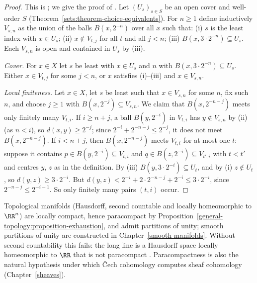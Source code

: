 \begin{proof}
This is \cite{stone-1948}; we give the proof of \cite{rudin-paracompact}. Let $(U_s)_{s \in S}$ be an open cover and well-order $S$
(Theorem~\ref{sets:theorem-choice-equivalents}). For $n \geq 1$ define inductively $V_{s,n}$ as the union of the balls $B(x, 2^{-n})$ over all $x$ such
that: (i) $s$ is the least index with $x \in U_s$; (ii) $x \notin V_{t,j}$ for all $t$ and all $j < n$; (iii) $B(x, 3 \cdot 2^{-n}) \subseteq U_s$. Each
$V_{s,n}$ is open and contained in $U_s$ by (iii).

\emph{Cover.} For $x \in X$ let $s$ be least with $x \in U_s$ and $n$ with $B(x, 3 \cdot 2^{-n}) \subseteq U_s$. Either $x \in V_{t,j}$ for some $j < n$, or $x$
satisfies (i)--(iii) and $x \in V_{s,n}$.

\emph{Local finiteness.} Let $x \in X$, let $s$ be least such that $x \in V_{s,n}$ for some $n$, fix such $n$, and choose $j \geq 1$ with $B(x, 2^{-j}) \subseteq V_{s,n}$.
We claim that $B(x, 2^{-n-j})$ meets only finitely many $V_{t,i}$. If $i \geq n + j$, a ball $B(y, 2^{-i})$ in $V_{t,i}$ has $y \notin V_{s,n}$ by (ii) (as
$n < i$), so $d(x, y) \geq 2^{-j}$; since $2^{-i} + 2^{-n-j} \leq 2^{-j}$, it does not meet $B(x, 2^{-n-j})$. If $i < n + j$, then $B(x, 2^{-n-j})$ meets
$V_{t,i}$ for at most one $t$: suppose it contains $p \in B(y, 2^{-i}) \subseteq V_{t,i}$ and $q \in B(z, 2^{-i}) \subseteq V_{t',i}$ with $t < t'$ and centres $y$, $z$
as in the definition. By (iii) $B(y, 3 \cdot 2^{-i}) \subseteq U_t$, and by (i) $z \notin U_t$, so $d(y, z) \geq 3 \cdot 2^{-i}$. But
$d(y, z) < 2^{-i} + 2 \cdot 2^{-n-j} + 2^{-i} \leq 3 \cdot 2^{-i}$, since $2^{-n-j} \leq 2^{-i-1}$. So only finitely many pairs $(t, i)$ occur.
\end{proof}

\begin{remark}\label{general-topology:remark-paracompact}
Topological manifolds (Hausdorff, second countable and locally homeomorphic to $\RR^n$) are locally compact, hence paracompact by
Proposition~\ref{general-topology:proposition-exhaustion}, and admit partitions of unity; smooth partitions of unity are constructed in
Chapter~\ref{smooth-manifolds}. Without second countability this fails: the long line is a Hausdorff space locally homeomorphic to $\RR$ that is not
paracompact \cite{engelking-general-topology}. Paracompactness is also the natural hypothesis under which \v{C}ech cohomology computes sheaf
cohomology (Chapter~\ref{sheaves}).
\end{remark}

